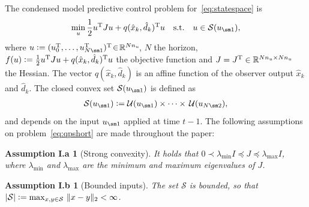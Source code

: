 \documentclass[hidelinks]{article}
\begin{document}
The condensed model predictive control problem for~\eqref{eq:statespace} is
\begin{align}\label{eq:qpshort}
\min_{{u}} \frac{1}{2}\trans{{u}}{J}{u}+\trans{{q}({\hat{x}}_k, {\hat{d}}_k)}{u}\quad\text{s.t.}\quad{u}\in\mathcal{S}({u}_{\sm 1}),
\end{align}
where ${u}\eqdef({u}_0^\Tr,\dots,{u}_{N\sm 1}^\Tr)^\Tr\!\in\!\R^{Nn_u}\!$, $N$ the horizon, $f(u)\vcentcolon=\frac{1}{2}{u}^{\text{T}}{J}{u}+{q}({\hat{x}}_k, {\hat{d}}_k)^{\text{T}}{u}$ the objective function and ${J}={J}^{\text{T}} \in \mathbb{R}^{{Nn_u}\times{Nn_u}}$ the Hessian. The vector ${q}({\hat{x}}_k, {\hat{d}}_k)$ is an affine function of the observer output ${\hat{x}}_k$ and ${\hat{d}}_k$. The closed convex set $\mathcal{S}({u}_{\sm 1})$ is defined as
\begin{align}\label{eq:set}
\mathcal{S}({u}_{\sm 1})\eqdef\mathcal{U}({u}_{\sm 1})\times\dots\times\,\mathcal{U}({u}_{N\sm 2}),
\end{align}
and depends on the input ${u}_{\sm 1}$ applied at time $t-1$. The following assumptions on problem~\eqref{eq:qpshort} are made throughout the paper: 
\newtheorem*{ass1}{Assumption I.a}
\begin{ass1}[Strong convexity]
It holds that $0\prec \lambda_\text{min}I\preceq J\preceq\lambda_\text{max}I$, where $\lambda_\text{min}$ and $\lambda_\text{max}$ are the minimum and maximum eigenvalues of $J$. 
\end{ass1}
\newtheorem*{ass2}{Assumption I.b}
\begin{ass2}[Bounded inputs]
The set $\mathcal{S}$ is bounded, so that $\left\lvert \mathcal{S} \right\rvert\vcentcolon= \max_{x,y\in\mathcal{S}}\,\Vert x-y \Vert_2<\infty$.
\end{ass2}
\end{document}
